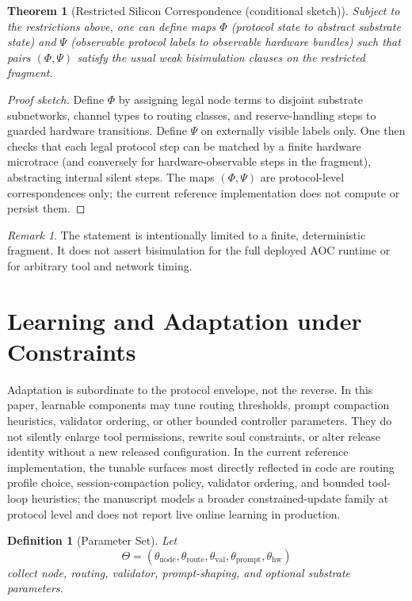 \documentclass[11pt]{article}
\newtheorem{definition}{Definition}[section]
\newtheorem{theorem}{Theorem}[section]
\theoremstyle{remark}
\newtheorem{remark}{Remark}[section]
\newcommand{\AOC}{\textup{\textsc{AOC}}}
\begin{document}
\begin{theorem}[Restricted Silicon Correspondence (conditional sketch)]
Subject to the restrictions above, one can define maps \(\Phi\) (protocol state to abstract substrate state) and \(\Psi\) (observable protocol labels to observable hardware bundles) such that pairs \((\Phi,\Psi)\) satisfy the usual weak bisimulation clauses on the restricted fragment.
\end{theorem}

\begin{proof}[Proof sketch]
Define \(\Phi\) by assigning legal node terms to disjoint substrate subnetworks, channel types to routing classes, and reserve-handling steps to guarded hardware transitions. Define \(\Psi\) on externally visible labels only. One then checks that each legal protocol step can be matched by a finite hardware microtrace (and conversely for hardware-observable steps in the fragment), abstracting internal silent steps. The maps \((\Phi,\Psi)\) are protocol-level correspondences only; the current reference implementation does not compute or persist them.
\end{proof}

\begin{remark}
The statement is intentionally limited to a finite, deterministic fragment. It does not assert bisimulation for the full deployed \AOC{} runtime or for arbitrary tool and network timing.
\end{remark}

\section[Learning and Adaptation]{Learning and Adaptation under Constraints}

Adaptation is subordinate to the protocol envelope, not the reverse. In this paper, learnable components may tune routing thresholds, prompt compaction heuristics, validator ordering, or other bounded controller parameters. They do not silently enlarge tool permissions, rewrite soul constraints, or alter release identity without a new released configuration. In the current reference implementation, the tunable surfaces most directly reflected in code are routing profile choice, session-compaction policy, validator ordering, and bounded tool-loop heuristics; the manuscript models a broader constrained-update family at protocol level and does not report live online learning in production.

\begin{definition}[Parameter Set]
Let
\[
\Theta=(\theta_{\mathrm{node}},\theta_{\mathrm{route}},\theta_{\mathrm{val}},\theta_{\mathrm{prompt}},\theta_{\mathrm{hw}})
\]
collect node, routing, validator, prompt-shaping, and optional substrate parameters.
\end{definition}
\end{document}

